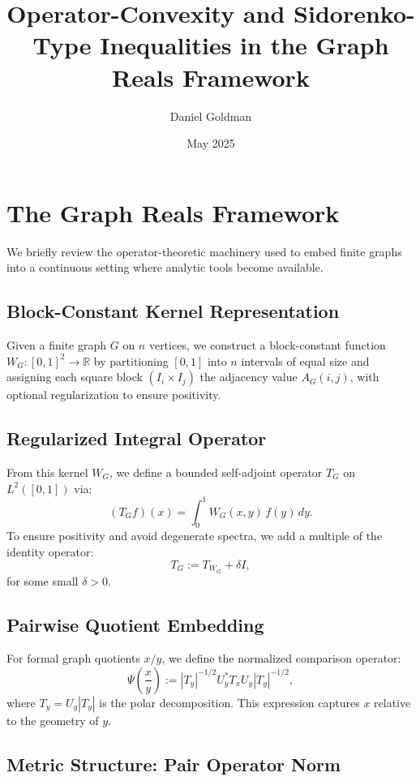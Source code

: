 \documentclass[11pt]{article}
\title{\bfseries Operator-Convexity and Sidorenko-Type Inequalities in the Graph Reals Framework}
\author{Daniel Goldman}
\date{May 2025}
\theoremstyle{definition}
\theoremstyle{plain}
\theoremstyle{remark}
\begin{document}
\maketitle

\section{The Graph Reals Framework}

We briefly review the operator-theoretic machinery used to embed finite graphs into a continuous setting where analytic tools become available.

\subsection*{Block-Constant Kernel Representation}

Given a finite graph $G$ on $n$ vertices, we construct a block-constant function $W_G: [0,1]^2 \to \mathbb{R}$ by partitioning $[0,1]$ into $n$ intervals of equal size and assigning each square block $(I_i \times I_j)$ the adjacency value $A_G(i,j)$, with optional regularization to ensure positivity.

\subsection*{Regularized Integral Operator}

From this kernel $W_G$, we define a bounded self-adjoint operator $T_G$ on $L^2([0,1])$ via:
\[
(T_G f)(x) = \int_0^1 W_G(x,y)\,f(y)\,dy.
\]
To ensure positivity and avoid degenerate spectra, we add a multiple of the identity operator:
\[
T_G := T_{W_G} + \delta I,
\]
for some small $\delta > 0$.

\subsection*{Pairwise Quotient Embedding}

For formal graph quotients $x/y$, we define the normalized comparison operator:
\[
\Psi\left(\frac{x}{y}\right) := |T_y|^{-1/2} U_y^* T_x U_y |T_y|^{-1/2},
\]
where $T_y = U_y |T_y|$ is the polar decomposition. This expression captures $x$ relative to the geometry of $y$.

\subsection*{Metric Structure: Pair Operator Norm}
\end{document}
